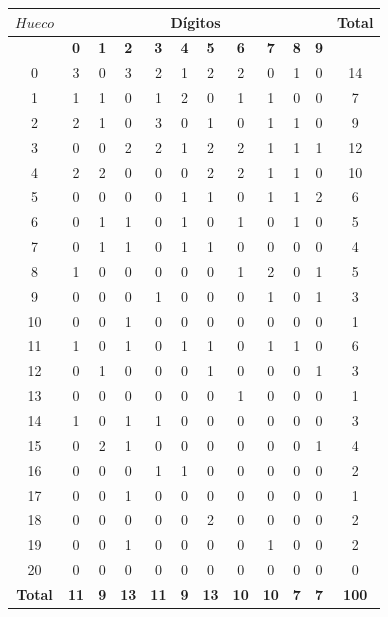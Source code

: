 \begin{tabular}{c|cccccccccc|c}

{\textbf{$Hueco$}} & \multicolumn{10}{c|}{\textbf{Dígitos}} & {\textbf{Total}} \\\hline
& \textbf{0} & \textbf{1} & \textbf{2} & \textbf{3} & \textbf{4} & \textbf{5} & \textbf{6} & \textbf{7} & \textbf{8} & \textbf{9} & \\\hline

0  & 3 & 0 & 3 & 2 & 1 & 2 & 2 & 0 & 1 & 0 & 14 \\
1  & 1 & 1 & 0 & 1 & 2 & 0 & 1 & 1 & 0 & 0 & 7 \\
2  & 2 & 1 & 0 & 3 & 0 & 1 & 0 & 1 & 1 & 0 & 9 \\
3  & 0 & 0 & 2 & 2 & 1 & 2 & 2 & 1 & 1 & 1 & 12 \\
4  & 2 & 2 & 0 & 0 & 0 & 2 & 2 & 1 & 1 & 0 & 10 \\
5  & 0 & 0 & 0 & 0 & 1 & 1 & 0 & 1 & 1 & 2 & 6 \\
6  & 0 & 1 & 1 & 0 & 1 & 0 & 1 & 0 & 1 & 0 & 5 \\
7  & 0 & 1 & 1 & 0 & 1 & 1 & 0 & 0 & 0 & 0 & 4 \\
8  & 1 & 0 & 0 & 0 & 0 & 0 & 1 & 2 & 0 & 1 & 5 \\
9  & 0 & 0 & 0 & 1 & 0 & 0 & 0 & 1 & 0 & 1 & 3 \\
10 & 0 & 0 & 1 & 0 & 0 & 0 & 0 & 0 & 0 & 0 & 1 \\
11 & 1 & 0 & 1 & 0 & 1 & 1 & 0 & 1 & 1 & 0 & 6 \\
12 & 0 & 1 & 0 & 0 & 0 & 1 & 0 & 0 & 0 & 1 & 3 \\
13 & 0 & 0 & 0 & 0 & 0 & 0 & 1 & 0 & 0 & 0 & 1 \\
14 & 1 & 0 & 1 & 1 & 0 & 0 & 0 & 0 & 0 & 0 & 3 \\
15 & 0 & 2 & 1 & 0 & 0 & 0 & 0 & 0 & 0 & 1 & 4 \\
16 & 0 & 0 & 0 & 1 & 1 & 0 & 0 & 0 & 0 & 0 & 2 \\
17 & 0 & 0 & 1 & 0 & 0 & 0 & 0 & 0 & 0 & 0 & 1 \\
18 & 0 & 0 & 0 & 0 & 0 & 2 & 0 & 0 & 0 & 0 & 2 \\
19 & 0 & 0 & 1 & 0 & 0 & 0 & 0 & 1 & 0 & 0 & 2 \\
20 & 0 & 0 & 0 & 0 & 0 & 0 & 0 & 0 & 0 & 0 & 0 \\\hline

\textbf{Total} & \textbf{11} & \textbf{9} & \textbf{13} & \textbf{11} & \textbf{9} & \textbf{13} & \textbf{10} & \textbf{10} & \textbf{7} & \textbf{7} & \textbf{100} \\

\end{tabular}

